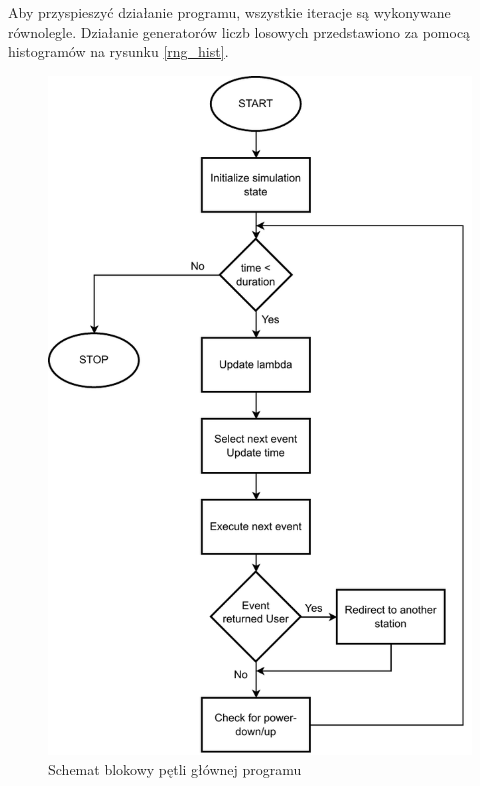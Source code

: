 \noindent Aby przyspieszyć działanie programu, wszystkie iteracje są wykonywane równolegle. Działanie generatorów liczb losowych przedstawiono za pomocą histogramów na rysunku \ref{rng_hist}.


\begin{figure}
\center
\includegraphics[scale=0.75]{img/main_loop.pdf} 
\caption{Schemat blokowy pętli głównej programu}
\label{main_loop}
\end{figure}

